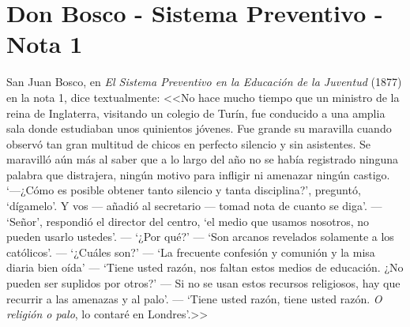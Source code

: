 \chapter{Don Bosco - Sistema Preventivo - Nota 1}
\label{ap:preventivo}
San Juan Bosco, en \emph{El Sistema Preventivo en la Educación de la Juventud} (1877) en la nota 1, dice textualmente: <<No hace mucho tiempo que un ministro de la reina de Inglaterra, visitando un colegio de Turín, fue conducido a una amplia sala donde estudiaban unos quinientos jóvenes. Fue grande su maravilla cuando observó tan gran multitud de chicos en perfecto silencio y sin asistentes. Se maravilló aún más al saber que a lo largo del año no se había registrado ninguna palabra que distrajera, ningún motivo para infligir ni amenazar ningún castigo. `---¿Cómo es posible obtener tanto silencio y tanta disciplina?', preguntó, `dígamelo'. Y vos --- añadió al secretario --- tomad nota de cuanto se diga'. --- `Señor', respondió el director del centro, `el medio que usamos nosotros, no pueden usarlo ustedes'. --- `¿Por qué?' --- `Son arcanos revelados solamente a los católicos'. --- `¿Cuáles son?' --- `La frecuente confesión y comunión y la misa diaria bien oída' --- `Tiene usted razón, nos faltan estos medios de educación. ¿No pueden ser suplidos por otros?' --- Si no se usan estos recursos religiosos, hay que recurrir a las amenazas y al palo'. --- `Tiene usted razón, tiene usted razón. \emph{O religión o palo}, lo contaré en Londres'.>> \citep{Canals95}
